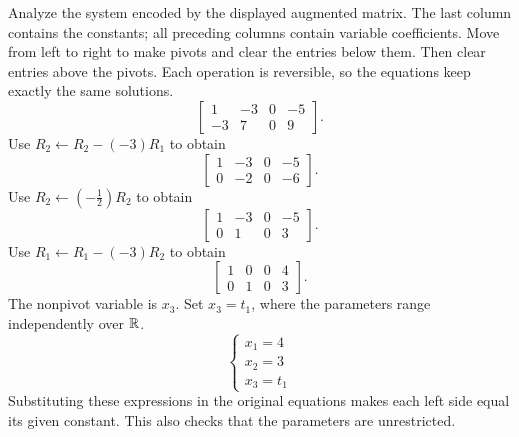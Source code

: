 \goal Analyze the system encoded by the displayed augmented matrix. The last column contains the constants; all preceding columns contain variable coefficients.
\idea Move from left to right to make pivots and clear the entries below them. Then clear entries above the pivots. Each operation is reversible, so the equations keep exactly the same solutions.
\[ \left[\begin{array}{rrr|r}1&-3&0&-5\\-3&7&0&9\end{array}\right].\]
Use $R_{2}\leftarrow R_{2}-(-3)R_{1}$ to obtain
\[ \left[\begin{array}{rrr|r}1&-3&0&-5\\0&-2&0&-6\end{array}\right].\]
Use $R_{2}\leftarrow(- \frac{1}{2})R_{2}$ to obtain
\[ \left[\begin{array}{rrr|r}1&-3&0&-5\\0&1&0&3\end{array}\right].\]
Use $R_{1}\leftarrow R_{1}-(-3)R_{2}$ to obtain
\[ \left[\begin{array}{rrr|r}1&0&0&4\\0&1&0&3\end{array}\right].\]
The nonpivot variable is $x_{3}$. Set $x_{3}=t_{1}$, where the parameters range independently over $\mathbb{R}$.
\[ \begin{cases}x_{1}=4\\x_{2}=3\\x_{3}=t_{1}\end{cases}\]
Substituting these expressions in the original equations makes each left side equal its given constant. This also checks that the parameters are unrestricted.

